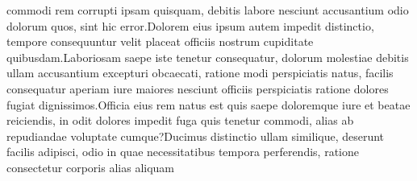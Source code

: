 \documentclass[letterpaper]{article} %
\theoremstyle{plain}
\begin{document}
commodi rem corrupti ipsam quisquam, debitis labore nesciunt accusantium odio dolorum quos, sint hic error.Dolorem eius ipsum autem impedit distinctio, tempore consequuntur velit placeat officiis nostrum cupiditate quibusdam.Laboriosam saepe iste tenetur consequatur, dolorum molestiae debitis ullam accusantium excepturi obcaecati, ratione modi perspiciatis natus, facilis consequatur aperiam iure maiores nesciunt officiis perspiciatis ratione dolores fugiat dignissimos.Officia eius rem natus est quis saepe doloremque iure et beatae reiciendis, in odit dolores impedit fuga quis tenetur commodi, alias ab repudiandae voluptate cumque?Ducimus distinctio ullam similique, deserunt facilis adipisci, odio in quae necessitatibus tempora perferendis, ratione consectetur corporis alias aliquam


\end{document}
